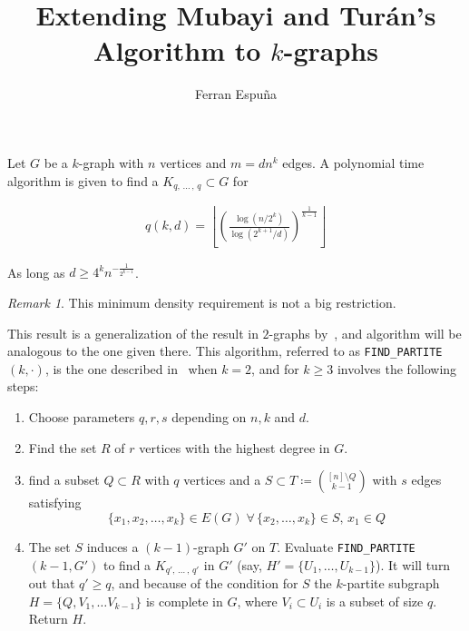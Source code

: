 \documentclass[12pt]{article}
\author{Ferran Espuña}
\date{} %
\theoremstyle{remark}
\newtheorem{remark}[thm]{Remark}
\begin{document}
    \title{Extending Mubayi and Turán's Algorithm to $k$-graphs}

    \maketitle

    Let $G$ be a $k$-graph with $n$ vertices and $m = dn^k$ edges.
    A polynomial time algorithm is given to find a $K_{q,\, \ldots\, ,\, q} \subset G$ for

    \begin{align*}
        q (k, d) = \left\lfloor \left(  \frac{\log (n/2^k)}{\log (2^{k+1}/d)} \right)^{\frac{1}{k-1}} \right\rfloor
        \label{eq:q}
    \end{align*}

    As long as $d \geq 4^k n^{-\frac{1}{2^{k-1}}}$.

    \begin{remark}
        This minimum density requirement is not a big restriction.
    \end{remark}

    This result is a generalization of the result in $2$-graphs by~\cite{MUBAYI2010174},
    and algorithm will be analogous to the one given there.
    This algorithm, referred to as \verb|FIND_PARTITE|$(k, \cdot)$,
    is the one described in~\cite{MUBAYI2010174}
    when $k=2$, and for $k \geq 3$ involves the following steps:

    \begin{enumerate}
        \item Choose parameters $q, r, s$ depending on $n, k$ and $d$. \label{step:choose_parameters}

        \item Find the set $R$ of $r$ vertices with the highest degree in $G$. \label{step:find_R}

        \item find a subset $Q \subset R$ with $q$ vertices and a
        $S \subset T \coloneqq \binom{[n] \setminus Q}{k-1}$ with $s$ edges satisfying
        \[\{x_1, x_2, \ldots, x_k\} \in E(G) \; \forall \, \{x_2, \ldots, x_k\} \in S, \, x_1 \in Q\] \label{step:find_Q_S}

        \item The set $S$ induces a $(k-1)$-graph $G'$ on $T$.
        Evaluate \verb|FIND_PARTITE|$(k-1, G')$ to find a $K_{q',\, \ldots\, ,\, q'}$ in $G'$
        (say, $H' = \{U_1, \ldots, U_{k-1}\}$). It will turn out that $q' \geq q$,
        and because of the condition for $S$ the $k$-partite subgraph $H = \{Q, V_1, \ldots V_{k-1}\}$
        is complete in $G$, where $V_i \subset U_i$ is a subset of size $q$.
        Return $H$.

    \end{enumerate}
\end{document}
